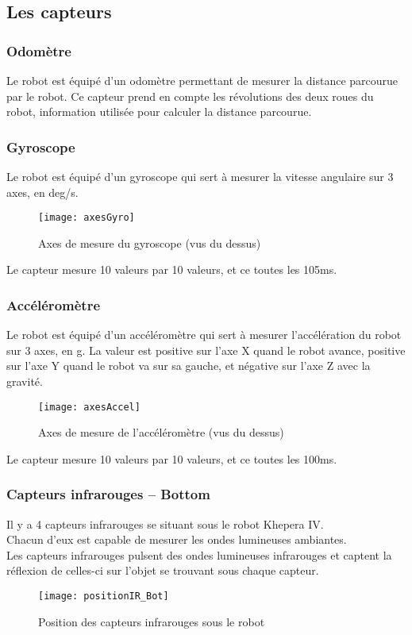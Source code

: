\documentclass[11pt]{article} %
\begin{document}
\subsection{Les capteurs}
\subsubsection{Odomètre}
Le robot est équipé d'un odomètre permettant de mesurer la distance parcourue par le robot.
Ce capteur prend en compte les révolutions des deux roues du robot, information utilisée pour calculer la distance parcourue.
\subsubsection{Gyroscope}
Le robot est équipé d'un gyroscope qui sert à mesurer la vitesse angulaire sur 3 axes, en deg/s.
\begin{figure}[H]
	\centering
	\caption{Axes de mesure du gyroscope (vus du dessus)}
	\texttt{[image: axesGyro]}
\end{figure}
Le capteur mesure 10 valeurs par 10 valeurs, et ce toutes les 105ms.
\subsubsection{Accéléromètre}
Le robot est équipé d'un accéléromètre qui sert à mesurer l'accélération du robot sur 3 axes, en g.
La valeur est positive sur l'axe X quand le robot avance, positive sur l'axe Y quand le robot va sur sa gauche, et négative sur l'axe Z avec la gravité.
\begin{figure}[H]
	\centering
	\caption{Axes de mesure de l'accéléromètre (vus du dessus)}
	\texttt{[image: axesAccel]}
\end{figure}
Le capteur mesure 10 valeurs par 10 valeurs, et ce toutes les 100ms.
\subsubsection{Capteurs infrarouges -- Bottom}
Il y a 4 capteurs infrarouges se situant sous le robot Khepera IV.\\
Chacun d'eux est capable de mesurer les ondes lumineuses ambiantes.\\
Les capteurs infrarouges pulsent des ondes lumineuses infrarouges et captent la réflexion de celles-ci sur l'objet se trouvant sous chaque capteur.\\
\begin{figure}[H]
	\centering
	\caption{Position des capteurs infrarouges sous le robot}
	\texttt{[image: positionIR\_Bot]}
\end{figure}
\end{document}
